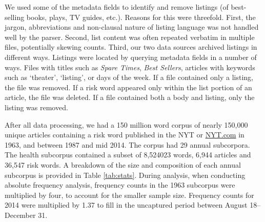     We used some of the metadata fields to identify and remove listings (of best-selling books, plays, TV guides, etc.). Reasons for this were threefold. First, the jargon, abbreviations and non-clausal nature of listing language was not handled well by the parser. Second, list content was often repeated verbatim in multiple files, potentially skewing counts. Third, our two data sources archived listings in different ways. Listings were located by querying metadata fields in a number of ways. Files with titles such as \emph{Spare Times}, \emph{Best Sellers}, articles with keywords such as `theater', `listing', or days of the week. If a file contained only a listing, the file was removed. If a risk word appeared only within the list portion of an article, the file was deleted. If a file contained both a body and listing, only the listing was removed.

    After all data processing, we had a 150 million word corpus of nearly 150,000 unique articles containing a risk word published in the NYT or \url{NYT.com} in 1963, and between 1987 and mid 2014. The corpus had 29 annual subcorpora. The health subcorpus contained a subset of 8,524023 words, 6,944 articles and 36,547 risk words. A breakdown of the size and composition of each annual subcorpus is provided in Table \ref{tab:stats}. During analysis, when conducting absolute frequency analysis, frequency counts in the 1963 subcorpus were multiplied by four, to account for the smaller sample size. Frequency counts for 2014 were multiplied by 1.37 to fill in the uncaptured period between August 18--December 31.

